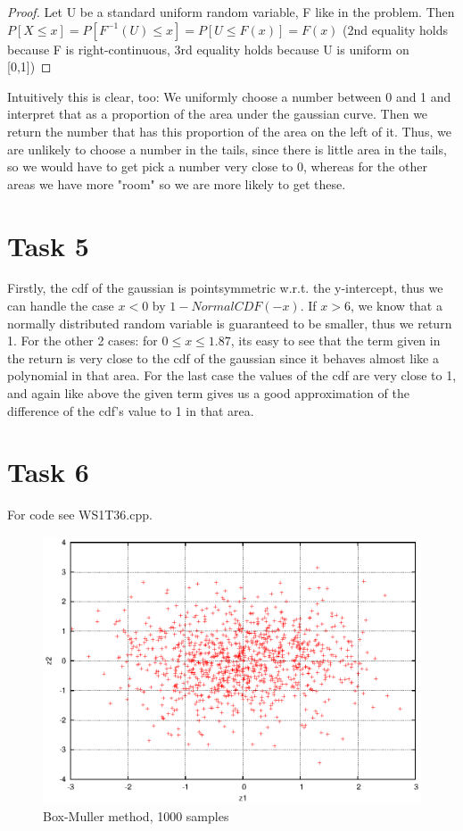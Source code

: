 \documentclass[]{article}
\begin{document}
\begin{proof}
Let U be a standard uniform random variable, F like in the problem. Then
$P\left[X\le x\right]=P\left[F^{-1}(U) \le x\right]=P\left[U \le
F(x)\right]=F(x)$ (2nd equality holds because F is right-continuous, 3rd
equality holds because U is uniform on [0,1])
\end{proof}

Intuitively this is clear, too: We uniformly choose a number between 0 and 1 and
interpret that as a proportion of the area under the gaussian curve. Then we
return the number that has this proportion of the area on the left of it. Thus,
we are unlikely to choose a number in the tails, since there is little area in
the tails, so we would have to get pick a number very close to 0, whereas for
the other areas we have more "room" so we are more likely to get these.

\section*{Task 5} Firstly, the cdf of the gaussian is pointsymmetric w.r.t. the
y-intercept, thus we can handle the case $x<0$ by $1-NormalCDF(-x)$. If $x>6$,
we know that a normally distributed random variable is guaranteed to be smaller,
thus we return 1. For the other 2 cases: for $0\le x\le 1.87$, its easy to see
that the term given in the return is very close to the cdf of the gaussian since
it behaves almost like a polynomial in that area. For the last case the values
of the cdf are very close to 1, and again like above the given term gives us a
good approximation of the difference of the cdf's value to 1 in that area.

\section*{Task 6} For code see WS1T36.cpp.
\begin{figure}[!ht]
\centering
\includegraphics{task6}
\caption{Box-Muller method, 1000 samples}
\label{fig:Task6}
\end{figure}
\end{document}
